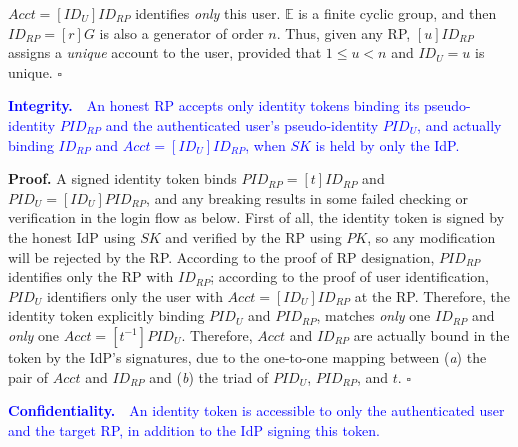 $Acct =  [ID_U]ID_{RP}$ identifies \emph{only} this user.
$\mathbb{E}$ is a finite cyclic group,
    and then $ID_{RP} = [r]G$ is also a generator of order $n$.
Thus, given any RP,
    $[u]ID_{RP}$ assigns a \emph{unique} account to the user,
        provided that $1 \leq u < n$ and $ID_U = u$ is unique. $\square$


\vspace{1mm}
\noindent\textcolor{blue}{\textbf{Integrity.}~~An honest RP accepts only identity tokens
 binding its pseudo-identity $PID_{RP}$ and the authenticated user's pseudo-identity $PID_U$,
 and actually binding $ID_{RP}$ and $Acct=[ID_U]ID_{RP}$,
 when $SK$ is held by only the IdP.}

\vspace{0.75mm}
\noindent\textbf{Proof.}
A signed identity token binds $PID_{RP} = [t]ID_{RP}$ and $PID_U = [ID_U]PID_{RP}$,
    and any breaking results in some failed checking or verification in the login flow as below.
First of all, the identity token is signed by the honest IdP using $SK$
        and verified by the RP using $PK$,
        so any modification will be rejected by the RP.
According to the proof of RP designation,
   $PID_{RP}$ identifies only the RP with $ID_{RP}$;
   according to the proof of user identification,
    $PID_U$ identifiers only the user with $Acct = [ID_U]ID_{RP}$ at the RP.
Therefore, the identity token explicitly binding $PID_U$ and $PID_{RP}$,
    matches \emph{only} one $ID_{RP}$ and \emph{only} one $Acct = [t^{-1}]PID_{U}$.
Therefore,
    $Acct$ and $ID_{RP}$ are actually bound in the token by the IdP's signatures,
        due to the one-to-one mapping between (\emph{a}) the pair of $Acct$ and $ID_{RP}$ and (\emph{b}) the triad of $PID_U$, $PID_{RP}$, and $t$. $\square$


\vspace{1mm}
\noindent\textcolor{blue}{\textbf{Confidentiality.}~~An identity token
    is accessible to only
                the authenticated user and the target RP, in addition to the IdP signing this token.}

